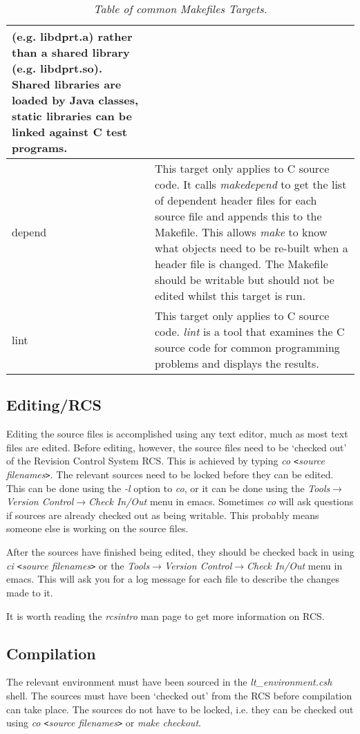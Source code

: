 \documentclass[10pt,a4paper]{article}
\begin{document}
\begin{table}[!h]
\begin{center}
\begin{footnotesize}
\begin{tabular}{|l|p{40em}|}
(e.g. libdprt.a) rather than a shared library (e.g. libdprt.so). Shared libraries are loaded by Java
classes, static libraries can be linked against C test programs.\\ \hline
depend			& This target only applies to C source code. It calls {\em makedepend} to get the
list of dependent header files for each source file and appends this to the Makefile. This allows {\em make}
to know what objects need to be re-built when a header file is changed.  The Makefile should be
writable but should not be edited whilst this target is run.\\ \hline
lint			& This target only applies to C source code. {\em lint} is a tool that examines the
C source code for common programming problems and displays the results.\\ \hline
\end{tabular}
\end{footnotesize}
\end{center}
\caption{\em Table of common Makefiles Targets.}
\label{tab:maketarget} 
\end{table}

\subsection{Editing/RCS}
Editing the source files is accomplished using any text editor, much as most text files are edited. Before 
editing, however, the source files need to be `checked out' of the Revision Control System RCS.
 This is achieved by typing
{\em co \verb'<'source filenames\verb'>'}. 
The relevant sources need to be locked before they can be edited. This can be done using the {\em -l} option to 
{\em co}, or it can be done using the {\em Tools$\rightarrow$Version Control$\rightarrow$Check In/Out} menu in emacs.
Sometimes {\em co} will ask questions if sources are already checked out as being
writable. This probably means someone else is working on the source files.

After the sources have finished being edited, they should be checked back in using {\em ci \verb'<'source filenames\verb'>'} or the {\em Tools$\rightarrow$Version Control$\rightarrow$Check In/Out} menu in emacs. This
will ask you for a log message for each file to describe the changes made to it.

It is worth reading the {\em rcsintro} man page to get more information on RCS.

\subsection{Compilation}
The relevant environment must have been sourced in the {\em lt\_environment.csh} shell. The sources must have been
`checked out' from the RCS before compilation can take place. The sources do not have to be locked, i.e. they can
be checked out using {\em co \verb'<'source filenames\verb'>'} or {\em make checkout}.
\end{document}
